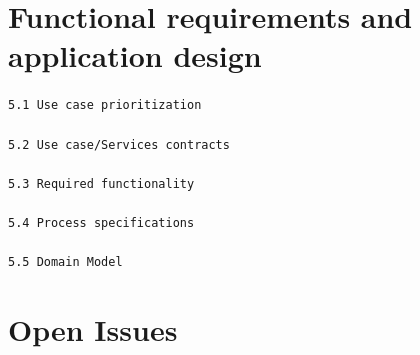\documentclass[a4paper,12pt]{report}
\begin{document}
\newpage
\section{Functional requirements and application design}

\texttt{5.1 Use case prioritization}
\emph{}\\
\emph{}\\
\texttt{5.2 Use case/Services contracts}
\emph{}\\
\emph{}\\
\texttt{5.3 Required functionality}
\emph{}\\
\emph{}\\
\texttt{5.4 Process specifications}
\emph{}\\
\emph{}\\
\texttt{5.5 Domain Model}

\newpage
\section{Open Issues}
\end{document}
